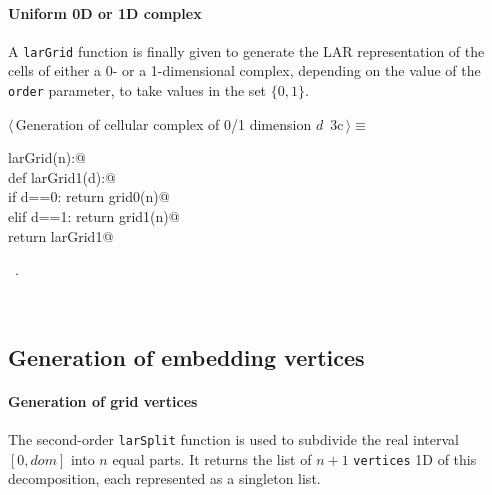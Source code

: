 \documentclass[11pt,oneside]{article}	%
\begin{document}
\paragraph{Uniform 0D or 1D complex}
A \texttt{larGrid} function is finally given to generate the LAR representation of the cells of either a 0- or a 1-dimensional complex, depending on the value of the \texttt{order} parameter, to take values in the set $\{0,1\}$.
\begin{flushleft} \small
\begin{minipage}{\linewidth} \label{scrap3}
\protect{}$\langle\,$Generation of cellular complex of 0/1 dimension $d$\nobreak\ {\footnotesize 3c}$\,\rangle\equiv$
\vspace{-1ex}
\begin{list}{}{} \item
\mbox{}\verb@def larGrid(n):@\\
\mbox{}\verb@    def larGrid1(d):@\\
\mbox{}\verb@        if d==0: return grid0(n)@\\
\mbox{}\verb@        elif d==1: return grid1(n)@\\
\mbox{}\verb@    return larGrid1@\\
\mbox{}\verb@@{\NWsep}
\end{list}
\vspace{-1ex}
\footnotesize\addtolength{\baselineskip}{-1ex}
\begin{list}{}{\setlength{\itemsep}{-\parsep}\setlength{\itemindent}{-\leftmargin}}
\item \NWtxtMacroRefIn\ .
\end{list}
\end{minipage}\\[4ex]
\end{flushleft}


\subsection{Generation of embedding vertices}

\paragraph{Generation of grid vertices}
The second-order \texttt{larSplit} function is used to subdivide the real interval $[0,dom]$ into $n$ equal parts. It returns the list of $n+1$ \texttt{vertices} 1D of this decomposition, each represented as a singleton list. 
\end{document}

